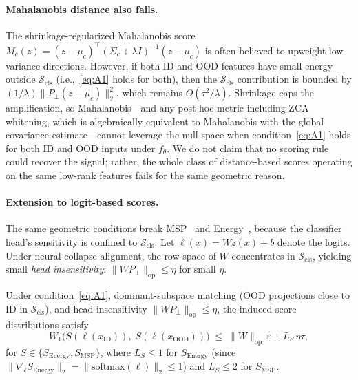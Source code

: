 \documentclass[runningheads]{llncs}
\begin{document}
\paragraph{Mahalanobis distance also fails.}
The shrinkage-regularized Mahalanobis score $M_c(z) = (z - \mu_c)^\top(\Sigma_c + \lambda I)^{-1}(z - \mu_c)$ is often believed to upweight low-variance directions.
However, if both ID and OOD features have small energy outside $\mathcal{S}_{\mathrm{cls}}$ (i.e.,~\eqref{eq:A1} holds for both), then the $\mathcal{S}_{\mathrm{cls}}^\perp$ contribution is bounded by $(1/\lambda)\|P_\perp(z - \mu_c)\|_2^2$, which remains $O(\tau^2/\lambda)$.
Shrinkage caps the amplification, so Mahalanobis---and any post-hoc metric including ZCA whitening, which is algebraically equivalent to Mahalanobis with the global covariance estimate---cannot leverage the null space when condition~\eqref{eq:A1} holds for both ID and OOD inputs under $f_\theta$.
We do not claim that no scoring rule could recover the signal; rather, the whole class of distance-based scores operating on the same low-rank features fails for the same geometric reason.

\paragraph{Extension to logit-based scores.}
The same geometric conditions break MSP~\cite{Hendrycks2017msp} and Energy~\cite{Liu2020energy}, because the classifier head's sensitivity is confined to $\mathcal{S}_{\mathrm{cls}}$.
Let $\ell(x) = Wz(x) + b$ denote the logits.
Under neural-collapse alignment, the row space of $W$ concentrates in $\mathcal{S}_{\mathrm{cls}}$, yielding small \emph{head insensitivity}: $\|WP_\perp\|_{\mathrm{op}} \le \eta$ for small $\eta$.

\begin{proposition}\label{prop:logit-fail}
Under condition~\eqref{eq:A1}, dominant-subspace matching (OOD projections close to ID in $\mathcal{S}_{\mathrm{cls}}$), and head insensitivity $\|WP_\perp\|_{\mathrm{op}} \le \eta$, the induced score distributions satisfy
\begin{equation}
  W_1\!\bigl(S(\ell(x_{\mathrm{ID}})),\; S(\ell(x_{\mathrm{OOD}}))\bigr) \;\le\; \|W\|_{\mathrm{op}}\,\varepsilon + L_S\,\eta\tau,
  \label{eq:logit-fail}
\end{equation}
for $S \in \{S_{\mathrm{Energy}}, S_{\mathrm{MSP}}\}$, where $L_S \le 1$ for $S_{\mathrm{Energy}}$ (since $\|\nabla_\ell S_{\mathrm{Energy}}\|_2 = \|\mathrm{softmax}(\ell)\|_2 \le 1$) and $L_S \le 2$ for $S_{\mathrm{MSP}}$.
\end{proposition}
\end{document}

